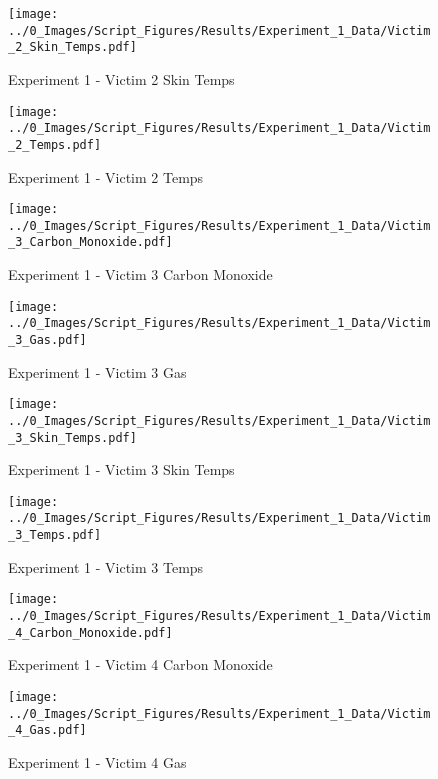 	\begin{figure}[H]
		\centering
		\texttt{[image: ../0\_Images/Script\_Figures/Results/Experiment\_1\_Data/Victim\_2\_Skin\_Temps.pdf]}
		\caption[]{Experiment 1 - Victim 2 Skin Temps}
	\end{figure}
 
	\clearpage

	\begin{figure}[H]
		\centering
		\texttt{[image: ../0\_Images/Script\_Figures/Results/Experiment\_1\_Data/Victim\_2\_Temps.pdf]}
		\caption[]{Experiment 1 - Victim 2 Temps}
	\end{figure}
 

	\begin{figure}[H]
		\centering
		\texttt{[image: ../0\_Images/Script\_Figures/Results/Experiment\_1\_Data/Victim\_3\_Carbon\_Monoxide.pdf]}
		\caption[]{Experiment 1 - Victim 3 Carbon Monoxide}
	\end{figure}
 
	\clearpage

	\begin{figure}[H]
		\centering
		\texttt{[image: ../0\_Images/Script\_Figures/Results/Experiment\_1\_Data/Victim\_3\_Gas.pdf]}
		\caption[]{Experiment 1 - Victim 3 Gas}
	\end{figure}
 

	\begin{figure}[H]
		\centering
		\texttt{[image: ../0\_Images/Script\_Figures/Results/Experiment\_1\_Data/Victim\_3\_Skin\_Temps.pdf]}
		\caption[]{Experiment 1 - Victim 3 Skin Temps}
	\end{figure}
 
	\clearpage

	\begin{figure}[H]
		\centering
		\texttt{[image: ../0\_Images/Script\_Figures/Results/Experiment\_1\_Data/Victim\_3\_Temps.pdf]}
		\caption[]{Experiment 1 - Victim 3 Temps}
	\end{figure}
 

	\begin{figure}[H]
		\centering
		\texttt{[image: ../0\_Images/Script\_Figures/Results/Experiment\_1\_Data/Victim\_4\_Carbon\_Monoxide.pdf]}
		\caption[]{Experiment 1 - Victim 4 Carbon Monoxide}
	\end{figure}
 
	\clearpage

	\begin{figure}[H]
		\centering
		\texttt{[image: ../0\_Images/Script\_Figures/Results/Experiment\_1\_Data/Victim\_4\_Gas.pdf]}
		\caption[]{Experiment 1 - Victim 4 Gas}
	\end{figure}
 

